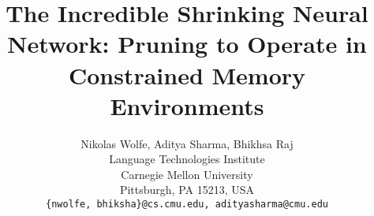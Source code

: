 \documentclass[hidelinks]{article} %
\title{The Incredible Shrinking Neural Network: Pruning to Operate in Constrained Memory Environments}
\author{Nikolas Wolfe, Aditya Sharma, Bhikhsa Raj\\
Language Technologies Institute\\
Carnegie Mellon University\\
Pittsburgh, PA 15213, USA \\
\texttt{\{nwolfe, bhiksha\}@cs.cmu.edu, {adityasharma}@cmu.edu}\\
}
\begin{document}
\maketitle



%
%
%

%

%
%

%
%
\pagebreak


%
%


	

	
\end{document}
